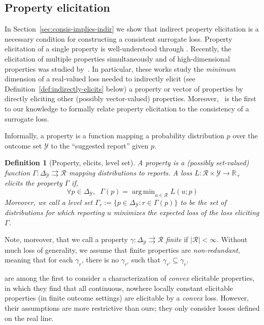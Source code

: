 \documentclass{article}
\newcommand{\reals}{\mathbb{R}}
\newcommand{\simplex}{\Delta_\Y}
\newcommand{\R}{\mathcal{R}}
\newcommand{\Y}{\mathcal{Y}}
\newcommand{\toto}{\rightrightarrows}
\newtheorem{definition}{Definition}
\DeclareMathOperator*{\argmin}{arg\,min}
\begin{document}
\subsection{Property elicitation}\label{subsec:properties}
In Section~\ref{sec:consis-implies-indir} we show that indirect property elicitation is a necessary condition for constructing a consistent surrogate loss.
Property elicitation of a single property is well-understood through \cite{savage1971elicitation,osband1985information-eliciting,lambert2008eliciting, lambert2009eliciting, lambert2018elicitation}.
Recently, the elicitation of multiple properties simultaneously and of high-dimensional properties was studied by~\cite{frongillo2015vector-valued,fissler2015higher,frongillo2018elicitation}.
In particular, these works study the \emph{minimum} dimension of a real-valued loss needed to indirectly elicit (see Definition~\ref{def:indirectly-elicits} below) a property or vector of properties by directly eliciting other (possibly vector-valued) properties.
Moreover,~\cite{agarwal2015consistent} is the first to our knowledge to formally relate property elicitation to the consistency of a surrogate loss.

Informally, a property is a function mapping a probability distribution $p$ over the outcome set $\Y$ to the ``suggested report'' given $p$.
\begin{definition}[Property, elicits, level set]
	A \emph{property} is a (possibly set-valued) function $\Gamma : \simplex \toto \R$ mapping distributions to reports.
	A loss $L : \R \times \Y \to \reals_+$ \emph{elicits} the property $\Gamma$ if,
	\begin{equation}
	\forall p \in \simplex, \;\; \Gamma(p) = \argmin_{u \in \R}L(u;p)
	\end{equation}
	Moreover, we call a \emph{level set} $\Gamma_r := \{p \in \simplex : r \in \Gamma(p)\}$ to be the set of distributions for which reporting $u$ minimizes the expected loss of the loss eliciting $\Gamma$.
\end{definition}

Note, moreover, that we call a property $\gamma: \simplex \toto \R$ \emph{finite} if $|\R| < \infty$.
Without much loss of generality, we assume that finite properties are \emph{non-redundant}, meaning that for each $\gamma_r$, there is no $\gamma_{r'}$ such that $\gamma_{r'} \subseteq \gamma_r$.

\cite{finocchiaro2018convex} are among the first to consider a characterization of \emph{convex} elicitable properties, in which they find that all continuous, nowhere locally constant elicitable properties (in finite outcome settings) are elicitable by a \emph{convex} loss.
However, their assumptions are more restrictive than ours; they only consider losses defined on the real line.%
\end{document}
